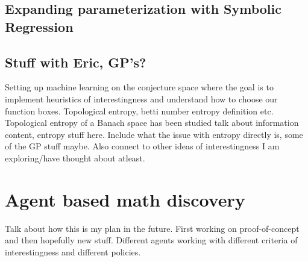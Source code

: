 \subsection{Expanding parameterization with Symbolic Regression}
\subsection{Stuff with Eric, GP's?}
Setting up machine learning on the conjecture space where the goal is to implement heuristics of interestingness and understand how to choose our function boxes.
Topological entropy, betti number entropy definition etc. Topological entropy of a Banach space has been studied \cite{bobokTopologicalEntropyBanach2011}
talk about information content, entropy stuff here. Include what the issue with entropy directly is, some of the GP stuff maybe. Also connect to other ideas of interestingness I am exploring/have thought about atleast.

\section{Agent based math discovery}
Talk about how this is my plan in the future. First working on proof-of-concept and then hopefully new stuff.
Different agents working with different criteria of interestingness and different policies.
